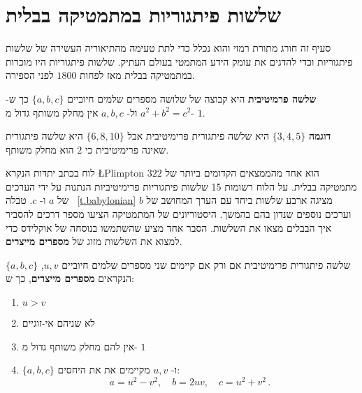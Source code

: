 
\section{ שלשות פיתגוריות במתמטיקה בבלית}\label{s.plimpton}

סעיף זה חורג מתורת רמזי
והוא נכלל כדי לתת טעימה מהתיאוריה העשירה של שלשות פיתגוריות
וכדי להדגים את עומק הידע המתמטי בעולם העתיק. שלשות פיתגוריות
היו מוכרות במתמטיקה בבלית
מאז לפחות 
$1800$
לפני הספירה.
\begin{definition}
\textbf{שלשה פרמיטיבית}
היא קבוצה של שלושה מספרים שלמים חיוביים
$\{a,b,c\}$ 
כך ש-%
$a^2+b^2=c^2$
ול-%
$a,b,c$
אין מחלק משותף גדול מ-%
$1$.
\end{definition}
\textbf{דוגמה}
$\{3,4,5\}$
היא שלשה פיתגורית
פרימיטיבית אבל 
$\{6,8,10\}$
היא שלשה פיתגורית
שאינה פרימיטיבית כי
$2$
הוא מחלק משותף.

לוח בכתב יתדות הנקרא 
\L{Plimpton $322$}
הוא אחד מהממצאים הקדומים ביותר של מתמטיקה בבלית. על הלוח רשומות 15 שלשות פיתגוריות
פרימיטיביות הנתנות על ידי הערכים של
$a$
ו-%
$c$.
טבלה%
~\ref{t.babylonian}
מציגה ארבע שלשות ביחד עם הערך המחושב של 
$b$
וערכים נוספים שנדון בהם בהמשך. היסטוריונים של המתמטיקה הציעו מספר דרכים להסביר איך הבבלים מצאו את השלשות. הסבר אחד מציע שהשתמשו בנוסחה של אוקלידס
כדי למצוא את השלשות מזוג של
\textbf{מספרים מייצרים}.
\begin{theorem}[אוקלידס]\label{thm.euclid-function}
$\{a,b,c\}$ 
שלשה פיתגורית פרימיטיבית אם ורק אם קיימים שני מספרים שלמים חיוביים 
$u,v$,
הנקראים
\textbf{מספרים מייצרים},
כך ש:
\begin{enumerate}
\item $u>v$
\item
לא שניהם אי-זוגיים
\item
אין להם מחלק משותף גדול מ-%
$1$
\item 
$\{a,b,c\}$
ו-%
$u,v$
מקיימים את את היחסים:
\[
a=u^2-v^2,\quad b=2uv,\quad c=u^2+v^2\,.
\]
\end{enumerate}
\end{theorem}

